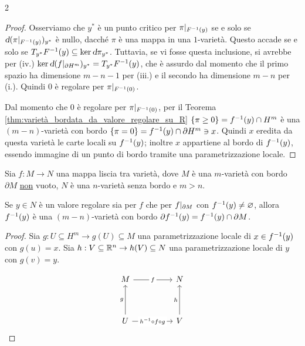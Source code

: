 \begin{multicols*}{2}
\begin{proof}
        Osserviamo che $y^*$ è un punto critico per $\pi\arrowvert_{F^{-1}(y)}$ se e solo se $\dif (\restr{\pi}{F\inv(y)})_{y^*}$ è nullo,
        dacché $\pi$ è una mappa in una $1$-varietà.
        Questo accade se e solo se $T_{y^*} F\inv(y) \subseteq \ker \dif \pi_{y^*}$. Tuttavia, se vi fosse questa inclusione, si avrebbe per (iv.)
        $\ker \dif (\restr{f}{\partial H^m})_{y^*} = T_{y^*} F\inv(y)$, che è assurdo dal momento che il primo spazio ha dimensione $m-n-1$ per (iii.)
        e il secondo ha dimensione $m-n$ per (i.). Quindi $0$ è regolare per $\pi\arrowvert_{F^{-1}(0)}$. \smallskip

        Dal momento che $0$ è regolare per $\pi\arrowvert_{F^{-1}(0)}$, per il Teorema \ref{thm:varietà_bordata_da_valore_regolare_su_R}
        $\{\pi \geq 0\} = f^{-1}(y) \cap H^m$ è una $(m-n)$-varietà con bordo $\{\pi = 0\} = f^{-1}(y) \cap \partial H^m \ni x$.
        Quindi $x$ eredita da questa varietà le carte locali su $f^{-1}(y)$; inoltre $x$ appartiene al bordo di $f^{-1}(y)$,
        essendo immagine di un punto di bordo tramite una parametrizzazione locale.
    \end{proof}

    \begin{theorem} \label{thm:varietà_bordata_da_valore_regolare}
        Sia $f : M \to N$ una mappa liscia tra varietà, dove $M$ è una $m$-varietà con bordo $\partial M$ \underline{non} vuoto,
        $N$ è una $n$-varietà senza bordo e $m > n$. \smallskip

        Se $y \in N$ è un valore regolare sia per $f$ che per $f\arrowvert_{\partial M}$ con $f^{-1}(y) \neq \varnothing$,
        allora $f^{-1}(y)$ è una $(m-n)$-varietà con bordo $\partial f^{-1}(y) = f^{-1}(y) \cap \partial M$.
    \end{theorem}

    \begin{proof}
        Sia $g : U \subseteq H^m \to g(U) \subseteq M$ una parametrizzazione locale di $x \in f^{-1}(y)$
        con $g(u) = x$. Sia $h : V \subseteq \mathbb{R}^n \to h(V) \subseteq N$ una parametrizzazione
        locale di $y$ con $g(v) = y$. \smallskip

        \[\begin{tikzcd}
                M && N \\
                \\
                U && V
                \arrow["f"{description}, from=1-1, to=1-3]
                \arrow["g", from=3-1, to=1-1]
                \arrow["{h\inv \circ f \circ g}"{description}, from=3-1, to=3-3]
                \arrow["h", from=3-3, to=1-3]
            \end{tikzcd}\]


\end{proof}
\end{multicols*}
